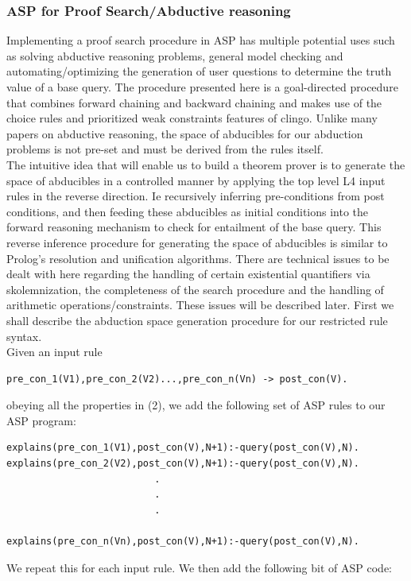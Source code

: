 \subsubsection{ASP for Proof Search/Abductive reasoning}
Implementing a proof search procedure in ASP has multiple potential uses such as solving abductive reasoning problems, general model checking and automating/optimizing the generation of user questions to determine the truth value of a base query. The procedure presented here is a goal-directed procedure that combines forward chaining and backward chaining and makes use of the choice rules and prioritized weak constraints features of clingo. Unlike many papers on abductive reasoning, the space of abducibles for our abduction problems is not pre-set  and must be derived from the rules itself.\\
The intuitive idea that will enable us to build a theorem prover is to generate the space of abducibles in a controlled manner by applying the top level L4 input rules  in the reverse direction. Ie recursively inferring pre-conditions from post conditions, and then feeding these abducibles as initial conditions into the forward reasoning mechanism to check for entailment of the base query. This reverse inference procedure for generating the space of abducibles is similar to Prolog's resolution and unification algorithms. There are technical issues to be dealt with here regarding the handling of certain existential quantifiers via skolemnization, the completeness of the search procedure and the handling of arithmetic operations/constraints. These issues will be described later. First we shall describe the abduction space generation procedure for our restricted rule syntax.\\
Given an input rule 
\begin{verbatim}
pre_con_1(V1),pre_con_2(V2)...,pre_con_n(Vn) -> post_con(V).
\end{verbatim}

obeying all the properties in (2), we add the following set of ASP rules to our ASP program: 
\begin{verbatim}
explains(pre_con_1(V1),post_con(V),N+1):-query(post_con(V),N).
explains(pre_con_2(V2),post_con(V),N+1):-query(post_con(V),N).
                          .
                          .
                          .
                        
explains(pre_con_n(Vn),post_con(V),N+1):-query(post_con(V),N).
\end{verbatim}
We repeat this for each input rule. We then add the following bit of ASP code:

